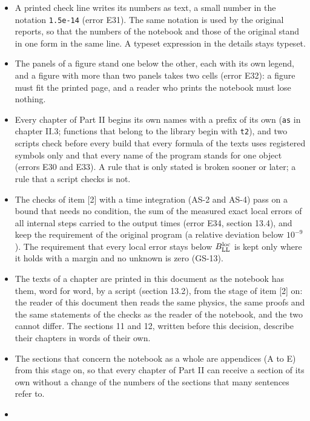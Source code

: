 \documentclass[
  10pt,
]{article}
\begin{document}
\begin{itemize}
  complete and stand-alone, and its printed form stays readable; the
  text before each of the two cells says how to open it.
\item
  A printed check line writes its numbers as text, a small number in the
  notation \texttt{1.5e-14} (error E31). The same notation is used by
  the original reports, so that the numbers of the notebook and those of
  the original stand in one form in the same line. A typeset expression
  in the details stays typeset.
\item
  The panels of a figure stand one below the other, each with its own
  legend, and a figure with more than two panels takes two cells (error
  E32): a figure must fit the printed page, and a reader who prints the
  notebook must lose nothing.
\item
  Every chapter of Part II begins its own names with a prefix of its own
  (\texttt{as} in chapter II.3; functions that belong to the library
  begin with \texttt{t2}), and two scripts check before every build that
  every formula of the texts uses registered symbols only and that every
  name of the program stands for one object (errors E30 and E33). A rule
  that is only stated is broken sooner or later; a rule that a script
  checks is not.
\item
  The checks of item {[}2{]} with a time integration (AS-2 and AS-4)
  pass on a bound that needs no condition, the sum of the measured exact
  local errors of all internal steps carried to the output times (error
  E34, section 13.4), and keep the requirement of the original program
  (a relative deviation below \(10^{-9}\)). The requirement that every
  local error stays below \(B^{\rm loc}_{\rm LL}\) is kept only where it
  holds with a margin and no unknown is zero (GS-13).
\item
  The texts of a chapter are printed in this document as the notebook
  has them, word for word, by a script (section 13.2), from the stage of
  item {[}2{]} on: the reader of this document then reads the same
  physics, the same proofs and the same statements of the checks as the
  reader of the notebook, and the two cannot differ. The sections 11 and
  12, written before this decision, describe their chapters in words of
  their own.
\item
  The sections that concern the notebook as a whole are appendices (A to
  E) from this stage on, so that every chapter of Part II can receive a
  section of its own without a change of the numbers of the sections
  that many sentences refer to.
\item

\end{itemize}
\end{document}
